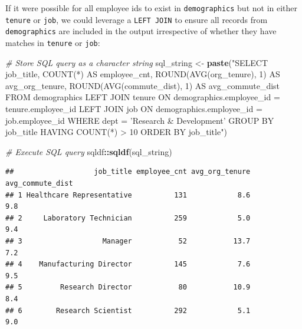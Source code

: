 \documentclass[]{book}
\newenvironment{Shaded}{\begin{snugshade}}{\end{snugshade}}
\newcommand{\CommentTok}[1]{\textcolor[rgb]{0.56,0.35,0.01}{\textit{#1}}}
\newcommand{\KeywordTok}[1]{\textcolor[rgb]{0.13,0.29,0.53}{\textbf{#1}}}
\newcommand{\NormalTok}[1]{#1}
\newcommand{\OperatorTok}[1]{\textcolor[rgb]{0.81,0.36,0.00}{\textbf{#1}}}
\newcommand{\StringTok}[1]{\textcolor[rgb]{0.31,0.60,0.02}{#1}}
\begin{document}
If it were possible for all employee ids to exist in \texttt{demographics} but not in either \texttt{tenure} or \texttt{job}, we could leverage a \texttt{LEFT\ JOIN} to ensure all records from \texttt{demographics} are included in the output irrespective of whether they have matches in \texttt{tenure} or \texttt{job}:

\begin{Shaded}
\begin{Highlighting}[]
\CommentTok{# Store SQL query as a character string}
\NormalTok{sql_string <-}\StringTok{ }\KeywordTok{paste}\NormalTok{(}\StringTok{"SELECT}
\StringTok{                      job_title,}
\StringTok{                      COUNT(*) AS employee_cnt,}
\StringTok{                      ROUND(AVG(org_tenure), 1) AS avg_org_tenure,}
\StringTok{                      ROUND(AVG(commute_dist), 1) AS avg_commute_dist}
\StringTok{                    FROM}
\StringTok{                        demographics}
\StringTok{                      LEFT JOIN}
\StringTok{                        tenure}
\StringTok{                      ON}
\StringTok{                        demographics.employee_id = tenure.employee_id}
\StringTok{                      LEFT JOIN}
\StringTok{                        job}
\StringTok{                      ON}
\StringTok{                        demographics.employee_id = job.employee_id}
\StringTok{                    WHERE}
\StringTok{                      dept = 'Research & Development'}
\StringTok{                    GROUP BY}
\StringTok{                      job_title}
\StringTok{                    HAVING}
\StringTok{                      COUNT(*) > 10}
\StringTok{                    ORDER BY}
\StringTok{                      job_title"}\NormalTok{)}

\CommentTok{# Execute SQL query}
\NormalTok{sqldf}\OperatorTok{::}\KeywordTok{sqldf}\NormalTok{(sql_string)}
\end{Highlighting}
\end{Shaded}

\begin{verbatim}
##                   job_title employee_cnt avg_org_tenure avg_commute_dist
## 1 Healthcare Representative          131            8.6              9.8
## 2     Laboratory Technician          259            5.0              9.4
## 3                   Manager           52           13.7              7.2
## 4    Manufacturing Director          145            7.6              9.5
## 5         Research Director           80           10.9              8.4
## 6        Research Scientist          292            5.1              9.0
\end{verbatim}
\end{document}
